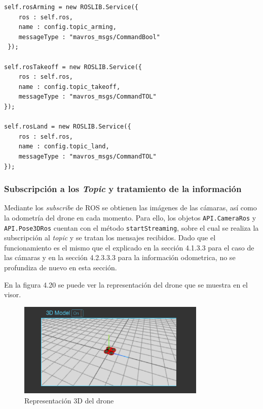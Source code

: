 \begin{lstlisting}[caption= {Definición de los mensajes para arrancar, despegar y aterrizar}, label=cod.mensajeextradrone]
self.rosArming = new ROSLIB.Service({
	ros : self.ros,
	name : config.topic_arming,
	messageType : "mavros_msgs/CommandBool"
 });

self.rosTakeoff = new ROSLIB.Service({
	ros : self.ros,
	name : config.topic_takeoff,
	messageType : "mavros_msgs/CommandTOL"
});

self.rosLand = new ROSLIB.Service({
	ros : self.ros,
	name : config.topic_land,
	messageType : "mavros_msgs/CommandTOL"
});
\end{lstlisting}

\subsubsection{Subscripción a los \textit{Topic} y tratamiento de la información}

Mediante los \textit{subscribe} de ROS se obtienen las imágenes de las cámaras, así como la odometría del drone en cada momento. Para ello, los objetos \texttt{API.CameraRos} y \texttt{API.Pose3DRos} cuentan con el método \texttt{startStreaming}, sobre el cual se realiza la subscripción al \textit{topic} y se tratan los mensajes recibidos. Dado que el funcionamiento es el mismo que el explicado en la sección 4.1.3.3 para el caso de las cámaras y en la sección 4.2.3.3.3 para la información odometrica, no se profundiza de nuevo en esta sección.

En la figura 4.20 se puede ver la representación del drone que se muestra en el visor.

\begin{figure}[H]
  \begin{center}
    \includegraphics[width=0.8\textwidth]{figures/3ddrone.png}
		\caption{Representación 3D del drone}
		\label{fig.3ddrone}
		\end{center}
\end{figure}

